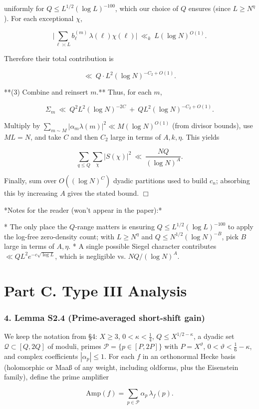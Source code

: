 \documentclass[11pt]{article}
\theoremstyle{definition}
\theoremstyle{remark}
\begin{document}
uniformly for $Q\le L^{1/2}(\log L)^{-100}$, which our choice of $Q$ ensures (since $L\ge N^{\eta}$). For each exceptional $\chi$,

$$
\Big|\sum_{\ell\asymp L} b^{(m)}_\ell\,\lambda(\ell)\chi(\ell)\Big|
\ \ll_k\ L(\log N)^{O(1)}.
$$

Therefore their total contribution is

$$
\ll\ Q\cdot L^2 (\log N)^{-C_2+O(1)}.
$$

**(3) Combine and reinsert $m$.**
Thus, for each $m$,

$$
\Sigma_m\ \ll\ Q^2 L^2 (\log N)^{-2C} \ +\ Q L^2 (\log N)^{-C_2+O(1)}.
$$

Multiply by $\sum_{m\sim M}|\alpha_m\lambda(m)|^2\ll M(\log N)^{O(1)}$ (from divisor bounds), use $ML=N$, and take $C$ and then $C_2$ large in terms of $A,k,\eta$. This yields

$$
\sum_{q\le Q}\sum_{\chi}|S(\chi)|^2\ \ll\ \frac{NQ}{(\log N)^A}.
$$

Finally, sum over $O((\log N)^C)$ dyadic partitions used to build $c_n$; absorbing this by increasing $A$ gives the stated bound. $\Box$

*Notes for the reader (won’t appear in the paper):*

* The only place the $Q$-range matters is ensuring $Q\le L^{1/2}(\log L)^{-100}$ to apply the log-free zero-density count; with $L\ge N^{\eta}$ and $Q\le N^{1/2}(\log N)^{-B}$, pick $B$ large in terms of $A,\eta$.
* A single possible Siegel character contributes $\ll Q L^2 e^{-c\sqrt{\log L}}$, which is negligible vs. $NQ/(\log N)^A$.


\part*{Part C. Type III Analysis}

\section*{4. Lemma S2.4 (Prime-averaged short-shift gain)}
We keep the notation from §4: $X\ge 3$, $0<\kappa<\tfrac14$, $Q\le X^{1/2-\kappa}$, a dyadic set $\mathcal Q\subset[Q,2Q]$ of moduli, primes $\mathcal P=\{p\in[P,2P]\}$ with $P=X^\vartheta$, $0<\vartheta<\tfrac16-\kappa$, and complex coefficients $|\alpha_p|\le 1$. For each $f$ in an orthonormal Hecke basis (holomorphic or Maaß of any weight, including oldforms, plus the Eisenstein family), define the prime amplifier

$$
\mathrm{Amp}(f)=\sum_{p\in\mathcal P}\alpha_p\,\lambda_f(p).
$$
\end{document}
